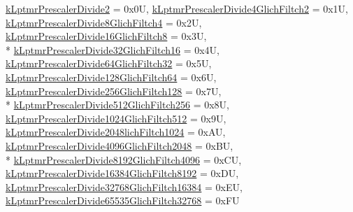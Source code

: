 \begin{DoxyCompactItemize}
\hyperlink{group__lptmr__hal_gga74f514106ef3e5e8fdf0670a22937c68a4d8b493f9c9cf076c0b20bc9c2482669}{k\+Lptmr\+Prescaler\+Divide2} = 0x0U, 
\hyperlink{group__lptmr__hal_gga74f514106ef3e5e8fdf0670a22937c68a33957bfa0fbef3231d665facb224e3d2}{k\+Lptmr\+Prescaler\+Divide4\+Glich\+Filtch2} = 0x1U, 
\hyperlink{group__lptmr__hal_gga74f514106ef3e5e8fdf0670a22937c68a83890e3c93247da0c7ae3f6a69fb9ba9}{k\+Lptmr\+Prescaler\+Divide8\+Glich\+Filtch4} = 0x2U, 
\hyperlink{group__lptmr__hal_gga74f514106ef3e5e8fdf0670a22937c68a1c42812fe9043f5c75c092865e7f1fe0}{k\+Lptmr\+Prescaler\+Divide16\+Glich\+Filtch8} = 0x3U, 
\\*
\hyperlink{group__lptmr__hal_gga74f514106ef3e5e8fdf0670a22937c68a8a56d7280ce4e27af8fd63b398fa99b9}{k\+Lptmr\+Prescaler\+Divide32\+Glich\+Filtch16} = 0x4U, 
\hyperlink{group__lptmr__hal_gga74f514106ef3e5e8fdf0670a22937c68a33085265788f2e282a9de0212f023ea3}{k\+Lptmr\+Prescaler\+Divide64\+Glich\+Filtch32} = 0x5U, 
\hyperlink{group__lptmr__hal_gga74f514106ef3e5e8fdf0670a22937c68abf23f05e546ffa7a9010558674bc59f7}{k\+Lptmr\+Prescaler\+Divide128\+Glich\+Filtch64} = 0x6U, 
\hyperlink{group__lptmr__hal_gga74f514106ef3e5e8fdf0670a22937c68a6cf0f2cec881dc7af720617799e9fc5a}{k\+Lptmr\+Prescaler\+Divide256\+Glich\+Filtch128} = 0x7U, 
\\*
\hyperlink{group__lptmr__hal_gga74f514106ef3e5e8fdf0670a22937c68a33b679158d2542c86b2ecef94e35b2a3}{k\+Lptmr\+Prescaler\+Divide512\+Glich\+Filtch256} = 0x8U, 
\hyperlink{group__lptmr__hal_gga74f514106ef3e5e8fdf0670a22937c68af9f4ea570328b642a6570621c0f4f20f}{k\+Lptmr\+Prescaler\+Divide1024\+Glich\+Filtch512} = 0x9U, 
\hyperlink{group__lptmr__hal_gga74f514106ef3e5e8fdf0670a22937c68a692c392ff6675438ae7308fe78d4d79f}{k\+Lptmr\+Prescaler\+Divide2048lich\+Filtch1024} = 0x\+AU, 
\hyperlink{group__lptmr__hal_gga74f514106ef3e5e8fdf0670a22937c68a77dd867f1fd46dc55de59bdde8d39c1b}{k\+Lptmr\+Prescaler\+Divide4096\+Glich\+Filtch2048} = 0x\+BU, 
\\*
\hyperlink{group__lptmr__hal_gga74f514106ef3e5e8fdf0670a22937c68aed7500a5731b1066601078e5d212dd51}{k\+Lptmr\+Prescaler\+Divide8192\+Glich\+Filtch4096} = 0x\+CU, 
\hyperlink{group__lptmr__hal_gga74f514106ef3e5e8fdf0670a22937c68aebbac99860271d7f6487d2cfafdffbae}{k\+Lptmr\+Prescaler\+Divide16384\+Glich\+Filtch8192} = 0x\+DU, 
\hyperlink{group__lptmr__hal_gga74f514106ef3e5e8fdf0670a22937c68a810d39a54cfc6bbc5d2d99bfd68d9875}{k\+Lptmr\+Prescaler\+Divide32768\+Glich\+Filtch16384} = 0x\+EU, 
\hyperlink{group__lptmr__hal_gga74f514106ef3e5e8fdf0670a22937c68a10cf9d11a627c9e30ba6f4d067edd91e}{k\+Lptmr\+Prescaler\+Divide65535\+Glich\+Filtch32768} = 0x\+FU

\end{DoxyCompactItemize}
